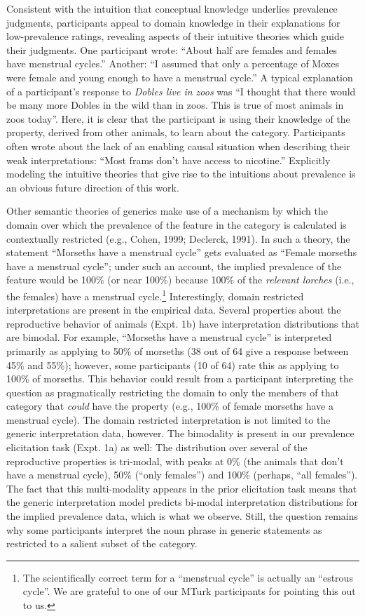 \documentclass[floatsintext,doc]{apa6}
\let\rmarkdownfootnote\footnote%
\def\footnote{\protect\rmarkdownfootnote}
\begin{document}
Consistent with the intuition that conceptual knowledge underlies prevalence judgments, participants appeal to domain knowledge in their explanations for low-prevalence ratings, revealing aspects of their intuitive theories which guide their judgments.
One participant wrote: \enquote{About half are females and females have menstrual cycles.}
Another: \enquote{I assumed that only a percentage of Moxes were female and young enough to have a menstrual cycle.}
A typical explanation of a participant's response to \emph{Dobles live in zoos} was \enquote{I thought that there would be many more Dobles in the wild than in zoos. This is true of most animals in zoos today}.
Here, it is clear that the participant is using their knowledge of the property, derived from other animals, to learn about the category.
Participants often wrote about the lack of an enabling causal situation when describing their weak interpretations: \enquote{Most frams don't have access to nicotine.}
Explicitly modeling the intuitive theories that give rise to the intuitions about prevalence is an obvious future direction of this work.

Other semantic theories of generics make use of a mechanism by which the domain over which the prevalence of the feature in the category is calculated is contextually restricted (e.g., Cohen, 1999; Declerck, 1991).
In such a theory, the statement \enquote{Morseths have a menstrual cycle} gets evaluated as \enquote{Female morseths have a menstrual cycle}; under such an account, the implied prevalence of the feature would be 100\% (or near 100\%) because 100\% of the \emph{relevant lorches} (i.e., the females) have a menstrual cycle.\footnote{The scientifically correct term for a \enquote{menstrual cycle} is actually an \enquote{estrous cycle}. We are grateful to one of our MTurk participants for pointing this out to us. }
Interestingly, domain restricted interpretations are present in the empirical data.
Several properties about the reproductive behavior of animals (Expt. 1b) have interpretation distributions that are bimodal.
For example, \enquote{Morseths have a menstrual cycle} is interpreted primarily as applying to 50\% of morseths (38 out of 64 give a response between 45\% and 55\%); however, some participants (10 of 64) rate this as applying to 100\% of morseths.
This behavior could result from a participant interpreting the question as pragmatically restricting the domain to only the members of that category that \emph{could} have the property (e.g., 100\% of female morseths have a menstrual cycle).
The domain restricted interpretation is not limited to the generic interpretation data, however.
The bimodality is present in our prevalence elicitation task (Expt. 1a) as well: The distribution over several of the reproductive properties is tri-modal, with peaks at 0\% (the animals that don't have a menstrual cycle), 50\% (\enquote{only females}) and 100\% (perhaps, \enquote{all females}).
The fact that this multi-modality appears in the prior elicitation task means that the generic interpretation model predicts bi-modal interpretation distributions for the implied prevalence data, which is what we observe.
Still, the question remains why some participants interpret the noun phrase in generic statements as restricted to a salient subset of the category.
\end{document}
